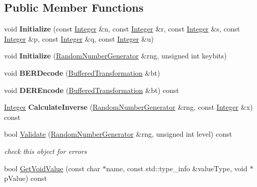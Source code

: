 \subsection*{Public Member Functions}
\begin{DoxyCompactItemize}
\item 
\hypertarget{class_invertible_rabin_function_a348e688b3a648defa9ca96bf16cc14d2}{
void {\bfseries Initialize} (const \hyperlink{class_integer}{Integer} \&n, const \hyperlink{class_integer}{Integer} \&r, const \hyperlink{class_integer}{Integer} \&s, const \hyperlink{class_integer}{Integer} \&p, const \hyperlink{class_integer}{Integer} \&q, const \hyperlink{class_integer}{Integer} \&u)}
\label{class_invertible_rabin_function_a348e688b3a648defa9ca96bf16cc14d2}

\item 
\hypertarget{class_invertible_rabin_function_a5097cd1653af359888c21b793c2d645a}{
void {\bfseries Initialize} (\hyperlink{class_random_number_generator}{RandomNumberGenerator} \&rng, unsigned int keybits)}
\label{class_invertible_rabin_function_a5097cd1653af359888c21b793c2d645a}

\item 
\hypertarget{class_invertible_rabin_function_ad770bc9e03d2f5b812655b6d8dd1d796}{
void {\bfseries BERDecode} (\hyperlink{class_buffered_transformation}{BufferedTransformation} \&bt)}
\label{class_invertible_rabin_function_ad770bc9e03d2f5b812655b6d8dd1d796}

\item 
\hypertarget{class_invertible_rabin_function_ae7296b7b97da157a6cb0dc193174aa2d}{
void {\bfseries DEREncode} (\hyperlink{class_buffered_transformation}{BufferedTransformation} \&bt) const }
\label{class_invertible_rabin_function_ae7296b7b97da157a6cb0dc193174aa2d}

\item 
\hypertarget{class_invertible_rabin_function_a15788f2fb0225297f665e30044661dfd}{
\hyperlink{class_integer}{Integer} {\bfseries CalculateInverse} (\hyperlink{class_random_number_generator}{RandomNumberGenerator} \&rng, const \hyperlink{class_integer}{Integer} \&x) const }
\label{class_invertible_rabin_function_a15788f2fb0225297f665e30044661dfd}

\item 
bool \hyperlink{class_invertible_rabin_function_ab943e623f7f1ffb3d890c1ab9e4e3474}{Validate} (\hyperlink{class_random_number_generator}{RandomNumberGenerator} \&rng, unsigned int level) const 
\begin{DoxyCompactList}\small\item\em check this object for errors \item\end{DoxyCompactList}\item 
\hypertarget{class_invertible_rabin_function_a52931eba7e69b47a1b9307dc92721e0f}{
bool \hyperlink{class_invertible_rabin_function_a52931eba7e69b47a1b9307dc92721e0f}{GetVoidValue} (const char $\ast$name, const std::type\_\-info \&valueType, void $\ast$pValue) const }
\label{class_invertible_rabin_function_a52931eba7e69b47a1b9307dc92721e0f}


\end{DoxyCompactItemize}
